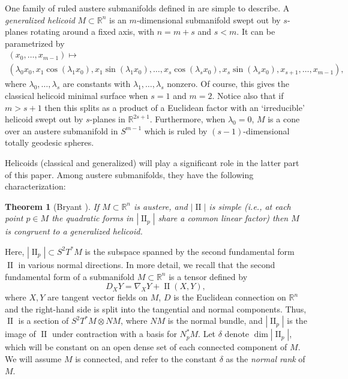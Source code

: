 \documentclass[12pt,reqno]{amsart}
\newtheorem*{theorem*}{Theorem}
\theoremstyle{definition}
\theoremstyle{remark}
\begin{document}
One family of ruled austere submanifolds defined in \cite{Baustere} are simple to describe.  A {\em generalized
helicoid} $M\subset {\mathbb R}^n$ is an $m$-dimensional submanifold swept out by $s$-planes rotating around a fixed axis,
with $n=m+s$ and $s<m$.  It can be parametrized by
\begin{multline}\label{heliparm}
(x_0, \ldots, x_{m-1}) \mapsto \\
(\lambda_0 x_0, x_1 \cos (\lambda_1 x_0), x_1 \sin (\lambda_1 x_0),
\ldots, x_s \cos (\lambda_s x_0), x_s \sin (\lambda_s x_0), x_{s+1}, \ldots, x_{m-1}),
\end{multline}
where $\lambda_0, \ldots, \lambda_s$ are constants with $\lambda_1,\ldots, \lambda_s$ nonzero.
Of course, this gives the classical
helicoid minimal surface when $s=1$ and $m=2$.  Notice also that if $m>s+1$ then this splits
as a product of a Euclidean factor with an `irreducible' helicoid swept out by $s$-planes in ${\mathbb R}^{2s+1}$.
Furthermore, when $\lambda_0=0$, $M$ is a cone over an austere submanifold in $S^{m-1}$ which
is ruled by $(s-1)$-dimensional totally geodesic spheres.

Helicoids (classical and generalized) will play a significant role in the latter part of this paper.
Among austere submanifolds, they have the following characterization:

\begin{theorem*}[Bryant \cite{Baustere}]  If $M \subset {\mathbb R}^n$ is austere, and $|{\operatorname{II}}|$ is {\em simple}
(i.e., at each point $p\in M$ the quadratic forms in $|{\operatorname{II}}_p|$ share a common linear factor) then $M$ is congruent to a generalized helicoid.
\end{theorem*}

Here, $|{\operatorname{II}}_p| \subset S^2 T^*M$ is the subspace spanned by the second fundamental form ${\operatorname{II}}$ in various normal directions.
In more detail, we recall that the second fundamental form of a submanifold $M \subset {\mathbb R}^n$ is
a tensor defined by
$$D_X Y = \nabla_X Y +{\operatorname{II}}(X,Y),$$
where $X,Y$ are tangent vector fields on $M$, $D$ is the Euclidean connection on ${\mathbb R}^n$ and the right-hand side is split
into the tangential and normal components.  Thus, ${\operatorname{II}}$ is a section of $S^2 T^*M \otimes NM$, where $NM$ is the normal bundle,
and $|{\operatorname{II}}_p|$ is the image of ${\operatorname{II}}$ under contraction with a basis for $N^*_pM$.
Let $\delta$ denote $\dim |{\operatorname{II}}_p|$, which will be constant on an
open dense set of each connected component of $M$.
We will assume $M$ is connected, and refer to the constant $\delta$ as the {\em normal rank}
of $M$.
\end{document}
